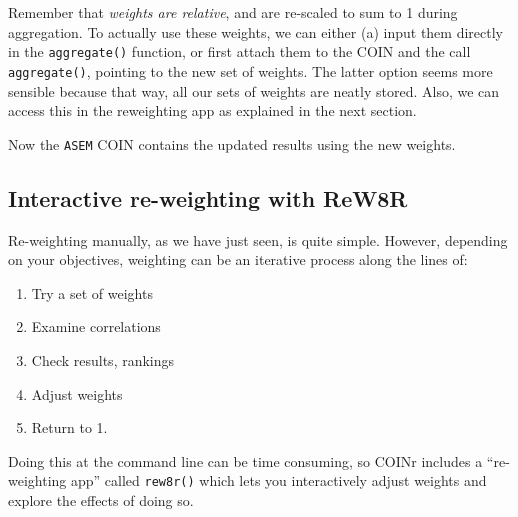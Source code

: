 \documentclass[
]{book}
\newenvironment{Shaded}{\begin{snugshade}}{\end{snugshade}}
\newcommand{\AttributeTok}[1]{\textcolor[rgb]{0.77,0.63,0.00}{#1}}
\newcommand{\CommentTok}[1]{\textcolor[rgb]{0.56,0.35,0.01}{\textit{#1}}}
\newcommand{\FunctionTok}[1]{\textcolor[rgb]{0.00,0.00,0.00}{#1}}
\newcommand{\NormalTok}[1]{#1}
\newcommand{\OtherTok}[1]{\textcolor[rgb]{0.56,0.35,0.01}{#1}}
\newcommand{\SpecialCharTok}[1]{\textcolor[rgb]{0.00,0.00,0.00}{#1}}
\newcommand{\StringTok}[1]{\textcolor[rgb]{0.31,0.60,0.02}{#1}}
\providecommand{\tightlist}{%
  \setlength{\itemsep}{0pt}\setlength{\parskip}{0pt}}
\begin{document}
Remember that \emph{weights are relative}, and are re-scaled to sum to 1 during aggregation. To actually use these weights, we can either (a) input them directly in the \texttt{aggregate()} function, or first attach them to the COIN and the call \texttt{aggregate()}, pointing to the new set of weights. The latter option seems more sensible because that way, all our sets of weights are neatly stored. Also, we can access this in the reweighting app as explained in the next section.

\begin{Shaded}
\end{Shaded}

Now the \texttt{ASEM} COIN contains the updated results using the new weights.

\hypertarget{interactive-re-weighting-with-rew8r}{%
\subsection{Interactive re-weighting with ReW8R}\label{interactive-re-weighting-with-rew8r}}

Re-weighting manually, as we have just seen, is quite simple. However, depending on your objectives, weighting can be an iterative process along the lines of:

\begin{enumerate}
\def\labelenumi{\arabic{enumi}.}
\tightlist
\item
  Try a set of weights
\item
  Examine correlations
\item
  Check results, rankings
\item
  Adjust weights
\item
  Return to 1.
\end{enumerate}

Doing this at the command line can be time consuming, so COINr includes a ``re-weighting app'' called \texttt{rew8r()} which lets you interactively adjust weights and explore the effects of doing so.
\end{document}
